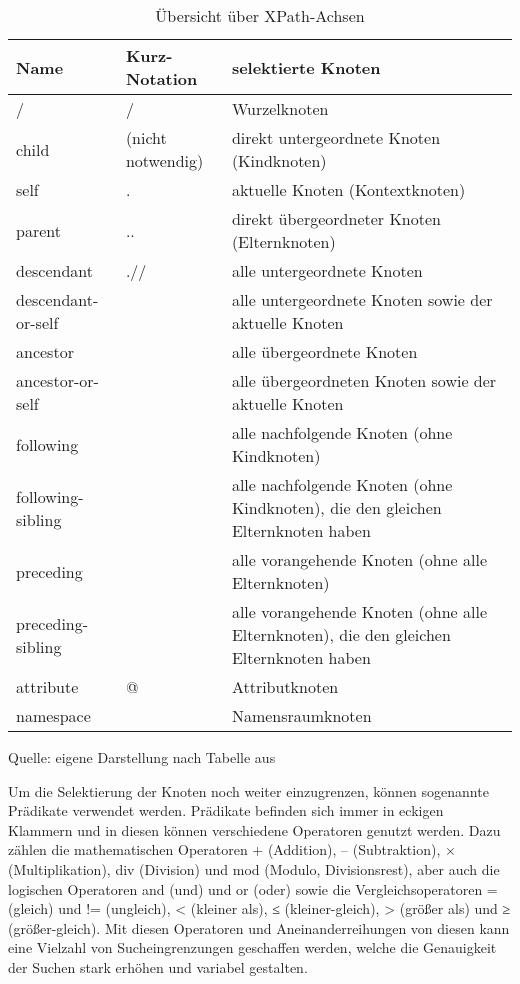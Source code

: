 \begin{table}[H]
    \centering
    \begin{tabular}{|l|l|p{8cm}|} %
        \hline
        \textbf{Name} & \textbf{Kurz-Notation} & \textbf{selektierte Knoten} \\
        \hline
        / & / & Wurzelknoten \\
        \hline
        child & (nicht notwendig) & direkt untergeordnete Knoten (Kindknoten) \\
        \hline
        self & . & aktuelle Knoten (Kontextknoten) \\
        \hline
        parent & .. & direkt übergeordneter Knoten (Elternknoten) \\
        \hline
        descendant & .// & alle untergeordnete Knoten \\
        \hline
        descendant-or-self &  & alle untergeordnete Knoten sowie der aktuelle Knoten \\
        \hline
        ancestor &  & alle übergeordnete Knoten \\
        \hline
        ancestor-or-self &  & alle übergeordneten Knoten sowie der aktuelle Knoten \\
        \hline
        following &  & alle nachfolgende Knoten (ohne Kindknoten) \\
        \hline
        following-sibling &  & alle nachfolgende Knoten (ohne Kindknoten), die den gleichen Elternknoten haben \\
        \hline
        preceding &  & alle vorangehende Knoten (ohne alle Elternknoten) \\
        \hline
        preceding-sibling &  & alle vorangehende Knoten (ohne alle Elternknoten), die den gleichen Elternknoten haben \\
        \hline
        attribute & @ & Attributknoten \\
        \hline
        namespace &  & Namensraumknoten \\
        \hline
    \end{tabular}
    \caption{Übersicht über XPath-Achsen}
    \label{tab:Übersicht über XPath-Achsen}
    \vspace{0.2cm}
    {Quelle: eigene Darstellung nach Tabelle aus \cite*{XPath2025}}
\end{table}


Um die Selektierung der Knoten noch weiter einzugrenzen, können sogenannte Prädikate verwendet werden.
Prädikate befinden sich immer in eckigen Klammern und in diesen können verschiedene Operatoren genutzt werden.
Dazu zählen die mathematischen Operatoren + (Addition), – (Subtraktion), × (Multiplikation), div (Division) und mod (Modulo, Divisionsrest),
aber auch die logischen Operatoren and (und) und or (oder) sowie die Vergleichsoperatoren = (gleich) und != (ungleich),
< (kleiner als), ≤ (kleiner-gleich), > (größer als) und ≥ (größer-gleich).
Mit diesen Operatoren und Aneinanderreihungen von diesen kann eine Vielzahl von Sucheingrenzungen geschaffen werden,
welche die Genauigkeit der Suchen stark erhöhen und variabel gestalten. \cite{XPath2025}

